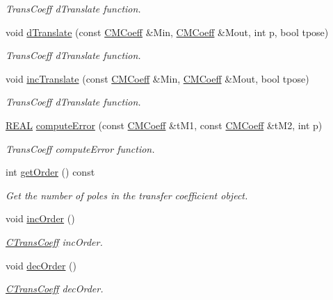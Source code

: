 \begin{DoxyCompactItemize}
\begin{DoxyCompactList}\small\item\em Trans\-Coeff d\-Translate function. \end{DoxyCompactList}\item 
void \hyperlink{classCTransCoeff_af1e5496a4734710f04841a202346aefb}{d\-Translate} (const \hyperlink{classCMCoeff}{C\-M\-Coeff} \&Min, \hyperlink{classCMCoeff}{C\-M\-Coeff} \&Mout, int p, bool tpose)
\begin{DoxyCompactList}\small\item\em Trans\-Coeff d\-Translate function. \end{DoxyCompactList}\item 
void \hyperlink{classCTransCoeff_a0b68420a4ae33fc1e8fa3dd00daf413c}{inc\-Translate} (const \hyperlink{classCMCoeff}{C\-M\-Coeff} \&Min, \hyperlink{classCMCoeff}{C\-M\-Coeff} \&Mout, bool tpose)
\begin{DoxyCompactList}\small\item\em Trans\-Coeff d\-Translate function. \end{DoxyCompactList}\item 
\hyperlink{util_8h_a5821460e95a0800cf9f24c38915cbbde}{R\-E\-A\-L} \hyperlink{classCTransCoeff_a9fb52e0afd88150756506af029f86611}{compute\-Error} (const \hyperlink{classCMCoeff}{C\-M\-Coeff} \&t\-M1, const \hyperlink{classCMCoeff}{C\-M\-Coeff} \&t\-M2, int p)
\begin{DoxyCompactList}\small\item\em Trans\-Coeff compute\-Error function. \end{DoxyCompactList}\item 
int \hyperlink{classCTransCoeff_a3c10d7ee9ead85dab5c5d2301cb6bb81}{get\-Order} () const 
\begin{DoxyCompactList}\small\item\em Get the number of poles in the transfer coefficient object. \end{DoxyCompactList}\item 
void \hyperlink{classCTransCoeff_a4148a93440f4f011c4fb8cb26667707e}{inc\-Order} ()
\begin{DoxyCompactList}\small\item\em \hyperlink{classCTransCoeff}{C\-Trans\-Coeff} inc\-Order. \end{DoxyCompactList}\item 
void \hyperlink{classCTransCoeff_a79b28e19c6f8c4a028296b351eb4a30a}{dec\-Order} ()
\begin{DoxyCompactList}\small\item\em \hyperlink{classCTransCoeff}{C\-Trans\-Coeff} dec\-Order. \end{DoxyCompactList}\item 

\end{DoxyCompactItemize}
